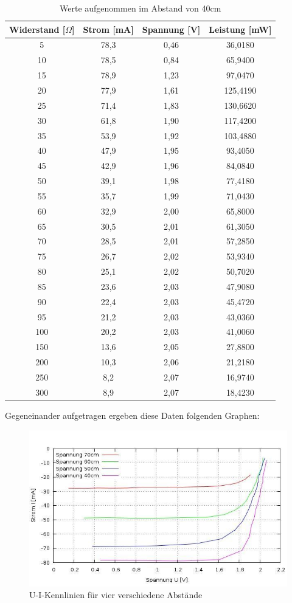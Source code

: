 \begin{table}[H]
\begin{tabular}{|c|c|c|c|}
\hline 
Widerstand [$\Omega$]	&Strom [mA]	&Spannung [V]	&Leistung [mW]\\	
\hline
5	&78,3	&0,46	&36,0180\\
10	&78,5	&0,84	&65,9400\\
15	&78,9	&1,23	&97,0470\\
20	&77,9	&1,61	&125,4190\\
25	&71,4	&1,83	&130,6620\\
30	&61,8	&1,90	&117,4200\\
35	&53,9	&1,92	&103,4880\\
40	&47,9	&1,95	&93,4050\\
45	&42,9	&1,96	&84,0840\\
50	&39,1	&1,98	&77,4180\\
55	&35,7	&1,99	&71,0430\\
60	&32,9	&2,00	&65,8000\\
65	&30,5	&2,01	&61,3050\\
70	&28,5	&2,01	&57,2850\\
75	&26,7	&2,02	&53,9340\\
80	&25,1	&2,02	&50,7020\\
85	&23,6	&2,03	&47,9080\\
90	&22,4	&2,03	&45,4720\\
95	&21,2	&2,03	&43,0360\\
100	&20,2	&2,03	&41,0060\\
150	&13,6	&2,05	&27,8800\\
200	&10,3	&2,06	&21,2180\\
250	&8,2	&2,07	&16,9740\\
300	&8,9	&2,07	&18,4230 \\
\hline 
\end{tabular}
\caption{Werte aufgenommen im Abstand von 40cm}
\end{table}
\renewcommand{\arraystretch}{1}

Gegeneinander aufgetragen ergeben diese Daten folgenden Graphen:

\begin{figure}[htbp]
	\includegraphics[width=\textwidth]{pics/alle_UI.jpg}
	\caption{U-I-Kennlinien für vier verschiedene Abstände}
\end{figure}

